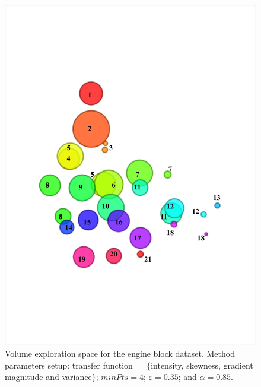 \begin{figure}[htb!]
    \centering
    \includegraphics[width=0.7\columnwidth]{figs/engine-block-clusters-tf.jpg}
    \caption{Volume exploration space for the engine block dataset. Method parameters setup: transfer function $=\{$intensity, skewness, gradient magnitude and variance$\}$; $minPts = 4$;  $\varepsilon = 0.35$; and $\alpha = 0.85$.}
    \label{fig:engine-block-clusters-tf}
\end{figure}

